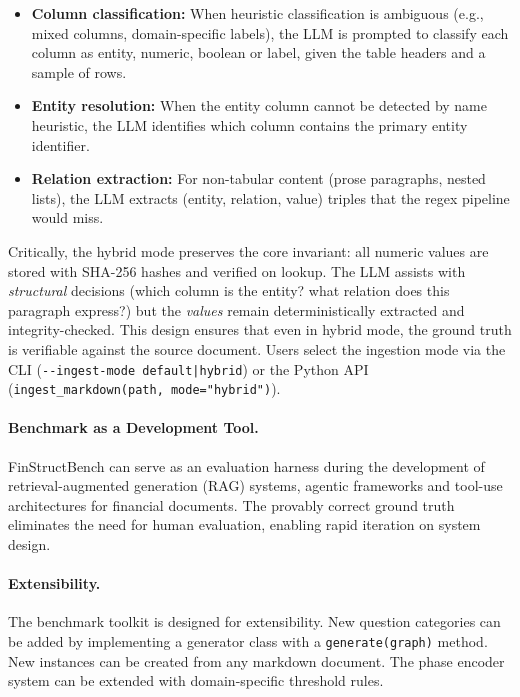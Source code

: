 \documentclass[11pt]{article}
\begin{document}
\begin{itemize}[leftmargin=2em]
  \item \textbf{Column classification:}  When heuristic classification
    is ambiguous (e.g., mixed columns, domain-specific labels), the
    LLM is prompted to classify each column as entity, numeric,
    boolean or label, given the table headers and a sample of rows.
  \item \textbf{Entity resolution:}  When the entity column cannot be
    detected by name heuristic, the LLM identifies which column
    contains the primary entity identifier.
  \item \textbf{Relation extraction:}  For non-tabular content (prose
    paragraphs, nested lists), the LLM extracts
    (entity, relation, value) triples that the regex pipeline would miss.
\end{itemize}

\noindent
Critically, the hybrid mode preserves the core invariant: all numeric
values are stored with SHA-256 hashes and verified on lookup.  The LLM
assists with \emph{structural} decisions (which column is the entity?
what relation does this paragraph express?) but the \emph{values}
remain deterministically extracted and integrity-checked.  This
design ensures that even in hybrid mode, the ground truth is
verifiable against the source document.  Users select the ingestion
mode via the CLI (\texttt{-{}-ingest-mode default|hybrid}) or the
Python API (\texttt{ingest\_markdown(path, mode="hybrid")}).

\paragraph{Benchmark as a Development Tool.}
FinStructBench can serve as an evaluation harness during the development
of retrieval-augmented generation (RAG) systems, agentic frameworks and
tool-use architectures for financial documents.  The provably correct
ground truth eliminates the need for human evaluation, enabling rapid
iteration on system design.

\paragraph{Extensibility.}
The benchmark toolkit is designed for extensibility.  New question
categories can be added by implementing a generator class with a
\texttt{generate(graph)} method.  New instances can be created from
any markdown document.  The phase encoder system can be extended with
domain-specific threshold rules.
\end{document}
